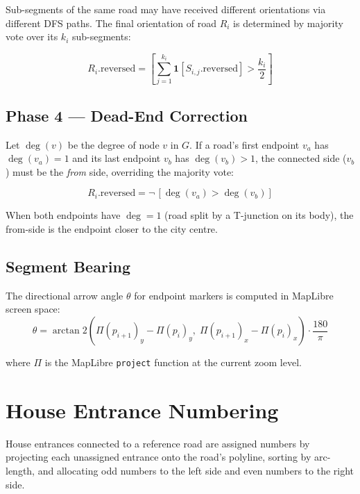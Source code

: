 \documentclass[12pt,a4paper]{article}
\theoremstyle{definition}
\theoremstyle{plain}
\theoremstyle{remark}
\begin{document}
Sub-segments of the same road may have received different orientations via
different DFS paths. The final orientation of road $R_i$ is determined by
majority vote over its $k_i$ sub-segments:

\begin{equation}
  R_i.\mathrm{reversed} =
  \left[
    \sum_{j=1}^{k_i} \mathbf{1}[S_{i,j}.\mathrm{reversed}]
    > \frac{k_i}{2}
  \right]
  \label{eq:majority_vote}
\end{equation}

\subsection{Phase 4 — Dead-End Correction}

Let $\deg(v)$ be the degree of node $v$ in $G$. If a road's first endpoint
$v_a$ has $\deg(v_a) = 1$ and its last endpoint $v_b$ has $\deg(v_b) > 1$,
the connected side ($v_b$) must be the \emph{from} side, overriding the
majority vote:

\begin{equation}
  R_i.\mathrm{reversed} = \neg\,[\deg(v_a) > \deg(v_b)]
  \label{eq:dead_end}
\end{equation}

When both endpoints have $\deg = 1$ (road split by a T-junction on its
body), the from-side is the endpoint closer to the city centre.

\subsection{Segment Bearing}

The directional arrow angle $\theta$ for endpoint markers is computed in
MapLibre screen space:
\begin{equation}
  \theta = \arctan2\!\left(
    \Pi(p_{i+1})_y - \Pi(p_i)_y,\;
    \Pi(p_{i+1})_x - \Pi(p_i)_x
  \right) \cdot \frac{180}{\pi}
  \label{eq:bearing}
\end{equation}

where $\Pi$ is the MapLibre \texttt{project} function at the current zoom level.

\section{House Entrance Numbering}
\label{sec:house_numbering}

House entrances connected to a reference road are assigned numbers by
projecting each unassigned entrance onto the road's polyline, sorting
by arc-length, and allocating odd numbers to the left side and even
numbers to the right side.
\end{document}
